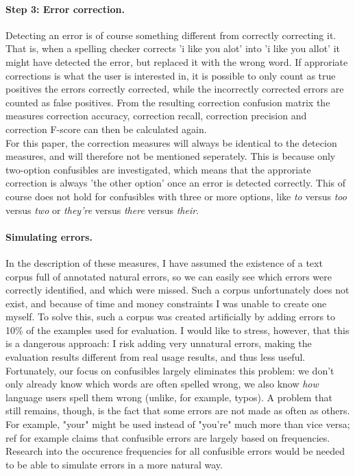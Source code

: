 \documentclass[12pt]{article}
\begin{document}
\paragraph{Step 3: Error correction.} Detecting an error is of course something different from correctly correcting it. That is, when a spelling checker corrects 'i like you alot' into 'i like you allot' it might have detected the error, but replaced it with the wrong word. If approriate corrections is what the user is interested in, it is possible to only count as true positives the errors correctly corrected, while the incorrectly corrected errors are counted as false positives. From the resulting correction confusion matrix the measures correction accuracy, correction recall, correction precision and correction F-score can then be calculated again. \\\indent
For this paper, the correction measures will always be identical to the detecion measures, and will therefore not be mentioned seperately. This is because only two-option confusibles are investigated, which means that the approriate correction is always 'the other option' once an error is detected correctly. This of course does not hold for confusibles with three or more options, like \emph{to} versus \emph{too} versus \emph{two} or \emph{they're} versus \emph{there} versus \emph{their}.

\paragraph{Simulating errors.} In the description of these measures, I have assumed the existence of a text corpus full of annotated natural errors, so we can easily see which errors were correctly identified, and which were missed. Such a corpus unfortunately does not exist, and because of time and money constraints I was unable to create one myself. To solve this, such a corpus was created artificially by adding errors to 10\% of the examples used for evaluation. I would like to stress, however, that this is a dangerous approach: I risk adding very unnatural errors, making the evaluation results different from real usage results, and thus less useful. \\\indent
Fortunately, our focus on confusibles largely eliminates this problem: we don't only already know which words are often spelled wrong, we also know \emph{how} language users spell them wrong (unlike, for example, typos). A problem that still remains, though, is the fact that some errors are not made as often as others. For example, "your" might be used instead of "you're" much more than vice versa; ref for example claims that confusible errors are largely based on frequencies. Research into the occurence frequencies for all confusible errors would be needed to be able to simulate errors in a more natural way.
\end{document}
